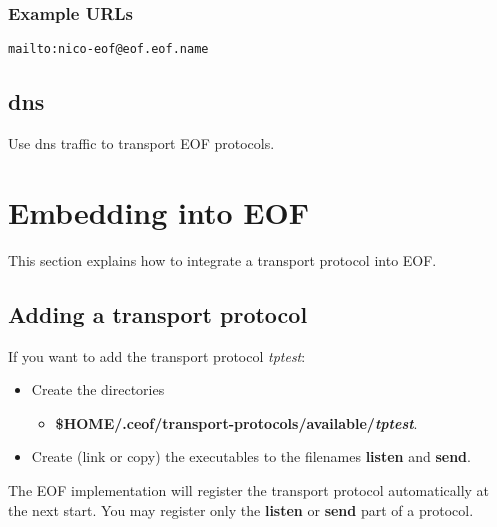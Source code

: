 \documentclass[12pt,a4paper]{book}
\begin{document}
\subsubsection{Example URLs}
\begin{verbatim}
mailto:nico-eof@eof.eof.name
\end{verbatim}
\subsection{dns}
Use dns traffic to transport EOF protocols.

\section{Embedding into EOF}
This section explains how to integrate a transport protocol into EOF.
\subsection{Adding a transport protocol}
If you want to add the transport protocol \emph{tptest}:
\begin{itemize}
\item Create the directories
\begin{itemize}
\item \textbf{\$HOME/.ceof/transport-protocols/available/\emph{tptest}}.
\end{itemize}
\item Create (link or copy) the executables to the filenames \textbf{listen}
and \textbf{send}.
\end{itemize}
The EOF implementation will register the transport protocol automatically
at the next start. You may register only the \textbf{listen} or
\textbf{send} part of a protocol.
\end{document}
